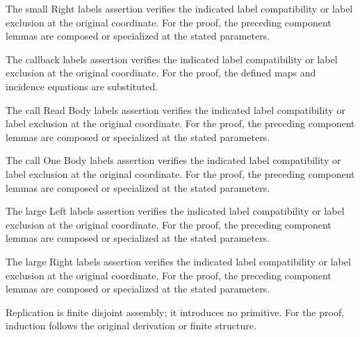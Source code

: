 The small Right labels assertion verifies the indicated label compatibility or label exclusion at the original coordinate.
For the proof, the preceding component lemmas are composed or specialized at the stated parameters.
\par{}

The callback labels assertion verifies the indicated label compatibility or label exclusion at the original coordinate.
For the proof, the defined maps and incidence equations are substituted.
\par{}

The call Read Body labels assertion verifies the indicated label compatibility or label exclusion at the original coordinate.
For the proof, the preceding component lemmas are composed or specialized at the stated parameters.
\par{}

The call One Body labels assertion verifies the indicated label compatibility or label exclusion at the original coordinate.
For the proof, the preceding component lemmas are composed or specialized at the stated parameters.
\par{}

The large Left labels assertion verifies the indicated label compatibility or label exclusion at the original coordinate.
For the proof, the preceding component lemmas are composed or specialized at the stated parameters.
\par{}

The large Right labels assertion verifies the indicated label compatibility or label exclusion at the original coordinate.
For the proof, the preceding component lemmas are composed or specialized at the stated parameters.
\par{}

Replication is finite disjoint assembly; it introduces no primitive.
For the proof, induction follows the original derivation or finite structure.
\par{}

